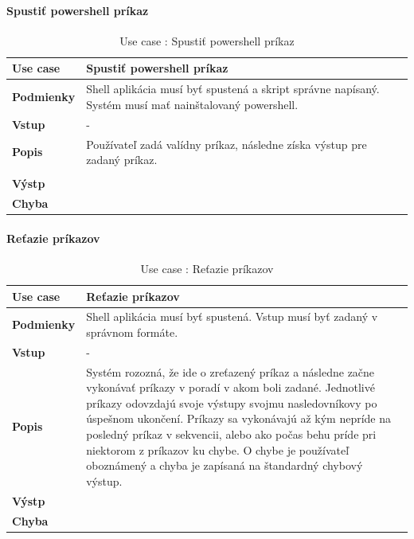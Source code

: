 \paragraph{Spustiť powershell príkaz}
\begin{center}
	\begin{table}[htbp]
		\begin{tabular}{|p{2.5cm}|p{14cm}|}
			\hline
			\textbf{Use case} & Spustiť powershell príkaz \\ 
			\hline
			\textbf{Podmienky} & Shell aplikácia musí byť spustená a skript správne napísaný. Systém musí mať nainštalovaný powershell.\\ 
			\hline
			\textbf{Vstup} & -\\
			\hline
			\textbf{Popis} & Používateľ zadá valídny príkaz, následne získa výstup pre zadaný príkaz. \\ 
			\hline\\
			\textbf{Výstp} & \\
			\hline
			\textbf{Chyba} & \\
			\hline
		\end{tabular}
	\label{table:1}
	\caption{Use case : Spustiť powershell príkaz}
	\end{table}
\end{center}
\paragraph{Reťazie príkazov}
\begin{center}
	\begin{table}[htbp]
		\begin{tabular}{|p{2.5cm}|p{14cm}|}
			\hline
			\textbf{Use case} & Reťazie príkazov \\ 
			\hline
			\textbf{Podmienky} & Shell aplikácia musí byť spustená. Vstup musí byť zadaný v správnom formáte.\\ 
			\hline
			\textbf{Vstup} & -\\
			\hline
			\textbf{Popis} & Systém rozozná, že ide o zreťazený príkaz a následne začne vykonávať príkazy v poradí v akom boli zadané. Jednotlivé príkazy odovzdajú svoje výstupy svojmu nasledovníkovy po úspešnom ukončení. Príkazy sa vykonávajú až kým nepríde na posledný príkaz v sekvencii, alebo ako počas behu príde pri niektorom z príkazov ku chybe. O chybe je používateľ oboznámený a chyba je zapísaná na štandardný chybový výstup. \\ 
			\hline
			\textbf{Výstp} & \\
			\hline
			\textbf{Chyba} & \\
			\hline
		\end{tabular}
	\label{table:1}
	\caption{Use case : Reťazie príkazov}
	\end{table}
\end{center}
\newpage

